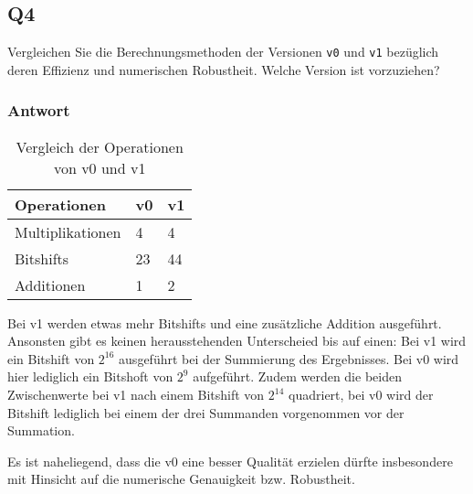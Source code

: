 \newpage
\subsection{Q4}
Vergleichen Sie die Berechnungsmethoden der Versionen \lstinline{v0} und
\lstinline{v1} bezüglich deren Effizienz und numerischen Robustheit.
Welche Version ist vorzuziehen?

\subsubsection*{Antwort}

\begin{table}[h!]
	\centering
	\begin{tabular}{l l l}
		Operationen
			& v0
			& v1 \\
		\hline
		Multiplikationen
			& 4
			& 4 \\
		Bitshifts
			& 23
			& 44 \\
		Additionen
			& 1
			& 2 \\
	\end{tabular}
	\caption{Vergleich der Operationen von v0 und v1}
\end{table}

Bei v1 werden etwas mehr Bitshifts und eine zusätzliche Addition ausgeführt.
Ansonsten gibt es keinen herausstehenden Unterscheied bis auf einen: Bei v1
wird ein Bitshift von $2^{16}$ ausgeführt bei der Summierung des Ergebnisses.
Bei v0 wird hier lediglich ein Bitshoft von $2^9$ aufgeführt. Zudem werden die
beiden Zwischenwerte bei v1 nach einem Bitshift von $2^{14}$ quadriert, bei
v0 wird der Bitshift lediglich bei einem der drei Summanden vorgenommen vor
der Summation.

Es ist naheliegend, dass die v0 eine besser Qualität erzielen dürfte
insbesondere mit Hinsicht auf die numerische Genauigkeit bzw. Robustheit.
